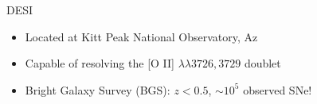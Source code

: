 \begin{frame}{DESI}
    \begin{itemize}
        \item Located at Kitt Peak National Observatory, Az
        \item Capable of resolving the [O II] $\lambda \lambda3726,3729$ doublet \parencite{Guy2023}
        \item Bright Galaxy Survey (BGS): $z<0.5$, $\sim10^5$ observed SNe! \parencite{desicollaboration2016, hahn2022}
    \end{itemize}
\end{frame}

